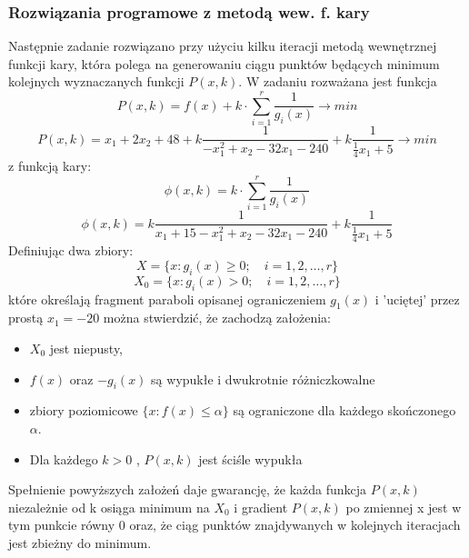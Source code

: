 \documentclass[a4paper,15pt]{article}
\begin{document}
\subsubsection{Rozwiązania programowe z metodą wew. f. kary}
Następnie zadanie rozwiązano przy użyciu kilku iteracji metodą wewnętrznej funkcji kary, która polega na generowaniu ciągu punktów będących minimum kolejnych wyznaczanych funkcji \(P(x,k)\). W zadaniu rozważana jest funkcja 
\begin{equation*}
P(x,k)=f(x)+ k \cdot \sum_{i=1}^{r}\frac{1}{ g_{i}(x)} \rightarrow min
\end{equation*}
\begin{equation*}
P(x,k)= x_{1} + 2x_{2} + 48 + k\frac{1}{-x_{1}^{2} + x_{2} -32x_{1} - 240} + k\frac{1}{\frac{1}{4}x_{1} + 5} \rightarrow min
\end{equation*}
z funkcją kary:
\begin{equation*}
\phi(x,k) = k \cdot \sum_{i=1}^{r}\frac{1}{ g_{i}(x)}
\end{equation*}
\begin{equation*}
\phi(x,k) = k\frac{1}{x_{1}+15-x_{1}^{2} + x_{2} -32x_{1} - 240} + k\frac{1}{\frac{1}{4}x_{1} + 5}
\end{equation*}
Definiując dwa zbiory: \\
\begin{equation*}
X=\{x: g_{i}(x) \geq 0 ; \quad i =1,2, \dots ,r\}
\end{equation*}
\begin{equation*}
X_{0}=\{x: g_{i}(x) > 0 ; \quad i =1,2, \dots ,r\}
\end{equation*}
które określają fragment paraboli opisanej ograniczeniem \( g_{1}(x) \) i 'uciętej' przez prostą \( x_{1} = -20 \) można stwierdzić, że zachodzą założenia: 
\begin{itemize}
\item \( X_{0} \) jest niepusty,
\item \( f(x) \) oraz \(-g_{i}(x) \) są wypukłe i dwukrotnie różniczkowalne
\item zbiory poziomicowe \( \{ x: f(x) \leq \alpha \} \) są ograniczone dla każdego skończonego \( \alpha \).
\item Dla każdego \( k > 0 \) , \( P(x,k) \) jest ściśle wypukła 
\end{itemize}
Spełnienie powyższych założeń daje gwarancję, że każda funkcja \( P(x,k) \) niezależnie od k osiąga minimum na \( X_{0} \) i gradient \( P(x,k) \) po zmiennej x jest w tym punkcie równy 0 oraz, że ciąg punktów znajdywanych w kolejnych iteracjach jest zbieżny do minimum. 
\end{document}
